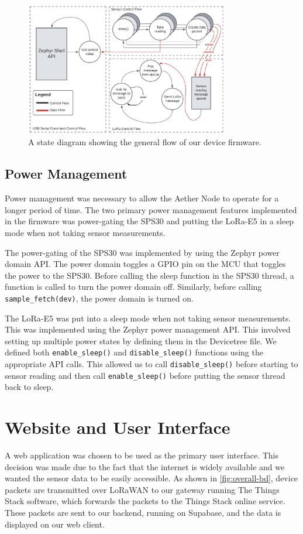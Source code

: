 \documentclass[conference]{IEEEtran}
\newcommand*{\lorawan}{LoRaWAN\xspace}
\begin{document}
\begin{figure}
    \centering
    \includegraphics[width=3.5in]{img/firmware_diagram.jpeg}
    \caption{A state diagram showing the general flow of our device firmware.}
    \label{fig:firmware}
\end{figure}

\subsection{Power Management}
Power management was necessary to allow the Aether Node to operate for a longer period of time. The two primary power management features implemented in the firmware was power-gating the SPS30 and putting the LoRa-E5 in a sleep mode when not taking sensor measurements.

The power-gating of the SPS30 was implemented by using the Zephyr power domain API. The power domain toggles a GPIO pin on the MCU that toggles the power to the SPS30. Before calling the sleep function in the SPS30 thread, a function is called to turn the power domain off. Similarly, before calling \texttt{sample\_fetch(dev)}, the power domain is turned on.

The LoRa-E5 was put into a sleep mode when not taking sensor measurements. This was implemented using the Zephyr power management API. This involved setting up multiple power states by defining them in the Devicetree file. We defined both \texttt{enable\_sleep()} and \texttt{disable\_sleep()} functions using the appropriate API calls. This allowed us to call \texttt{disable\_sleep()} before starting to sensor reading and then call \texttt{enable\_sleep()} before putting the sensor thread back to sleep.


\section{Website and User Interface}
A web application was chosen to be used as the primary user interface. This decision was made due to the fact that the internet is widely available and we wanted the sensor data to be easily accessible. As shown in \ref{fig:overall-bd}, device packets are transmitted over \lorawan to our gateway running The Things Stack software, which forwards the packets to the Things Stack online service. These packets are sent to our backend, running on Supabase, and the data is displayed on our web client.
\end{document}
